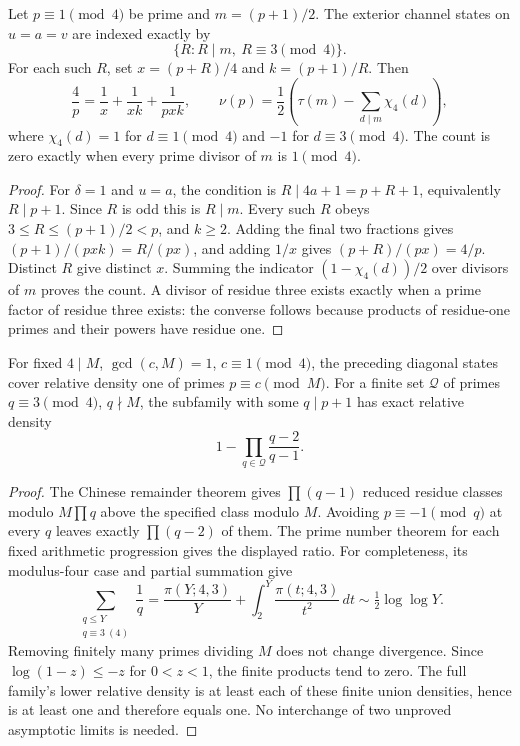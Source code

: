 \begin{proposition}\label{prop:esv3-diagonal}
Let $p\equiv1\pmod4$ be prime and $m=(p+1)/2$. The exterior channel
states on $u=a=v$ are indexed exactly by
\[
 \{R:R\mid m,\ R\equiv3\pmod4\}.
\]
For each such $R$, set $x=(p+R)/4$ and $k=(p+1)/R$. Then
\[
 \frac4p=\frac1x+\frac1{xk}+\frac1{pxk},\qquad
 \nu(p)=\frac12\left(\tau(m)-\sum_{d\mid m}\chi_4(d)\right),
\]
where $\chi_4(d)=1$ for $d\equiv1\pmod4$ and $-1$ for $d\equiv3\pmod4$.
The count is zero exactly when every prime divisor of $m$ is $1\pmod4$.
\end{proposition}
\begin{proof}
For $\delta=1$ and $u=a$, the condition is $R\mid4a+1=p+R+1$,
equivalently $R\mid p+1$. Since $R$ is odd this is $R\mid m$.
Every such $R$ obeys $3\le R\le(p+1)/2<p$, and $k\ge2$.
Adding the final two fractions gives $(p+1)/(pxk)=R/(px)$,
and adding $1/x$ gives $(p+R)/(px)=4/p$.
Distinct $R$ give distinct $x$. Summing the indicator
$(1-\chi_4(d))/2$ over divisors of $m$ proves the count.
A divisor of residue three exists exactly when a prime factor of residue
three exists: the converse follows because products of residue-one primes
and their powers have residue one.
\end{proof}

\begin{proposition}\label{prop:esv3-density}
For fixed $4\mid M$, $\gcd(c,M)=1$, $c\equiv1\pmod4$, the preceding
diagonal states cover relative density one of primes $p\equiv c\pmod M$.
For a finite set $\mathcal Q$ of primes $q\equiv3\pmod4$, $q\nmid M$,
the subfamily with some $q\mid p+1$ has exact relative density
\[
 1-\prod_{q\in\mathcal Q}\frac{q-2}{q-1}.
\]
\end{proposition}
\begin{proof}
The Chinese remainder theorem gives $\prod(q-1)$ reduced residue classes
modulo $M\prod q$ above the specified class modulo $M$. Avoiding
$p\equiv-1\pmod q$ at every $q$ leaves exactly $\prod(q-2)$ of them.
The prime number theorem for each fixed arithmetic progression gives the
displayed ratio. For completeness, its modulus-four case and partial
summation give
\[
 \sum_{\substack{q\le Y\\q\equiv3\ (4)}}\frac1q
 =\frac{\pi(Y;4,3)}Y+\int_2^Y\frac{\pi(t;4,3)}{t^2}\,dt
 \sim\tfrac12\log\log Y.
\]
Removing finitely many primes dividing $M$ does not change divergence.
Since $\log(1-z)\le-z$ for $0<z<1$, the finite products tend to zero.
The full family's lower relative density is at least each of these finite
union densities, hence is at least one and therefore equals one.
No interchange of two unproved asymptotic limits is needed.
\end{proof}

